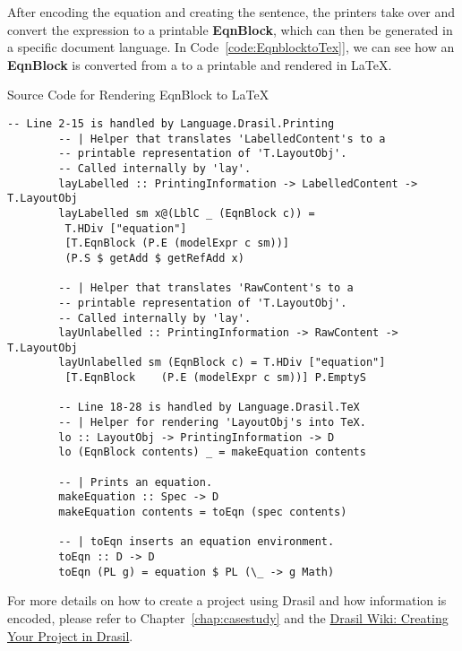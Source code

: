After encoding the equation and creating the sentence, the printers take over 
and convert the expression to a printable \textbf{EqnBlock}, which can then be 
generated in a specific document language. In Code~\ref{code:EqnblocktoTex]}, 
we can see how an \textbf{EqnBlock} is converted from a  to 
a printable  and rendered in LaTeX.

\begin{listing}
	\caption{Source Code for Rendering EqnBlock to LaTeX}
	\label{code:EqnblocktoTex]}
	\begin{lstlisting}[language=haskell1]
		-- Line 2-15 is handled by Language.Drasil.Printing
		-- | Helper that translates 'LabelledContent's to a 
		-- printable representation of 'T.LayoutObj'. 
		-- Called internally by 'lay'.
		layLabelled :: PrintingInformation -> LabelledContent -> T.LayoutObj
		layLabelled sm x@(LblC _ (EqnBlock c)) = 
		 T.HDiv ["equation"] 
		 [T.EqnBlock (P.E (modelExpr c sm))]
		 (P.S $ getAdd $ getRefAdd x)
		
		-- | Helper that translates 'RawContent's to a  
		-- printable representation of 'T.LayoutObj'. 
		-- Called internally by 'lay'.
		layUnlabelled :: PrintingInformation -> RawContent -> T.LayoutObj
		layUnlabelled sm (EqnBlock c) = T.HDiv ["equation"] 
		 [T.EqnBlock	(P.E (modelExpr c sm))] P.EmptyS
		
		-- Line 18-28 is handled by Language.Drasil.TeX
		-- | Helper for rendering 'LayoutObj's into TeX.
		lo :: LayoutObj -> PrintingInformation -> D
		lo (EqnBlock contents) _ = makeEquation contents
		
		-- | Prints an equation.
		makeEquation :: Spec -> D
		makeEquation contents = toEqn (spec contents)
		
		-- | toEqn inserts an equation environment.
		toEqn :: D -> D
		toEqn (PL g) = equation $ PL (\_ -> g Math)
	\end{lstlisting}
\end{listing}

For more details on how to create a project using Drasil and how information is 
encoded, please refer to Chapter~\ref{chap:casestudy} and the 
\href{https://github.com/JacquesCarette/Drasil/wiki/Creating-Your-Project-in-Drasil}{Drasil
 Wiki: Creating Your Project in Drasil}. 


